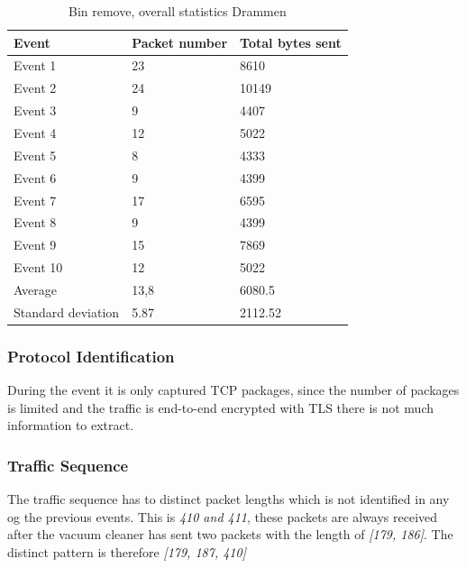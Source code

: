 \begin{table}[H]
\centering
\caption{Bin remove, overall statistics Drammen }
\label{tab:BRoverallDRA}
\begin{tabular}{|l|l|l|}
\hline
\textbf{Event} & \textbf{Packet number} & \textbf{Total bytes sent} \\ \hline
Event 1        & 23                     & 8610                      \\ \hline
Event 2        & 24                     & 10149                     \\ \hline
Event 3        & 9                      & 4407                      \\ \hline
Event 4        & 12                     & 5022                      \\ \hline
Event 5        & 8                      & 4333                      \\ \hline
Event 6        & 9                      & 4399                      \\ \hline
Event 7        & 17                     & 6595                      \\ \hline
Event 8        & 9                      & 4399                      \\ \hline
Event 9        & 15                     & 7869                      \\ \hline
Event 10       & 12                     & 5022                      \\ \hline
Average        & 13,8                   & 6080.5                    \\ \hline
Standard deviation        & 5.87
       & 2112.52               \\ \hline
\end{tabular}
\end{table}

\subsubsection{Protocol Identification}
During the event it is only captured TCP packages, since the number of packages is limited and the traffic is end-to-end encrypted with TLS there is not much information to extract. 

\subsubsection{Traffic Sequence}
The traffic sequence has to distinct packet lengths which is not identified in any og the previous events. This is \textit{410 and 411}, these packets are always received after the vacuum cleaner has sent two packets with the length of \textit{[179, 186]}. The distinct pattern is therefore \textit{[179, 187, 410]}

